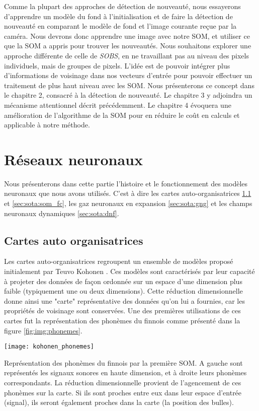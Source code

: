 	Comme la plupart des approches de détection de nouveauté, nous essayerons d'apprendre un modèle du fond à l'initialisation et de faire la détection de nouveauté en comparant le modèle de fond et l'image courante reçue par la caméra. Nous devrons donc apprendre une image avec notre SOM, et utiliser ce que la SOM a appris pour trouver les nouveautés. Nous souhaitons explorer une approche différente de celle de \textit{SOBS}, en ne travaillant pas au niveau des pixels individuels, mais de groupes de pixels. L'idée est de pouvoir intégrer plus d'informations de voisinage dans nos vecteurs d'entrée pour pouvoir effectuer un traitement de plus haut niveau avec les SOM. Nous présenterons ce concept dans le chapitre 2, consacré à la détection de nouveauté. Le chapitre 3 y adjoindra un mécanisme attentionnel décrit précédemment. Le chapitre 4 évoquera une amélioration de l'algorithme de la SOM pour en réduire le coût en calculs et applicable à notre méthode.

\newpage
\section{Réseaux neuronaux}

Nous présenterons dans cette partie l'histoire et le fonctionnement des modèles neuronaux que nous avons utilisés. C'est à dire les cartes auto-organisatrices \ref{sec:sota:som} et \ref{sec:sota:som_fc}, les gaz neuronaux en expansion \ref{sec:sota:gng} et les champs neuronaux dynamiques \ref{sec:sota:dnf}.

\subsection{Cartes auto organisatrices}\label{sec:sota:som}

	Les cartes auto-organisatrices regroupent un ensemble de modèles proposé initialement par Teuvo Kohonen \cite{kohonen-som82}. Ces modèles sont caractérisés par leur capacité à projeter des données de façon ordonnée sur un espace d'une dimension plus faible (typiquement une ou deux dimensions). Cette réduction dimensionnelle donne ainsi une "carte" représentative des données qu'on lui a fournies, car les propriétés de voisinage sont conservées. Une des premières utilisations de ces cartes fut la représentation des phonèmes du finnois comme présenté dans la figure \ref{fig:img:phonemes}.

	\begin{figureth}
		\texttt{[image: kohonen\_phonemes]}
		\caption[Phonème SOM]{Représentation des phonèmes du finnois par la première SOM. A gauche sont représentés les signaux sonores en haute dimension, et à droite leurs phonèmes correspondants. La réduction dimensionnelle provient de l'agencement de ces phonèmes sur la carte. Si ils sont proches entre eux dans leur espace d'entrée (signal), ils seront également proches dans la carte (la position des bulles)\footnotemark .}\label{fig:img:phonemes}

	\end{figureth}

